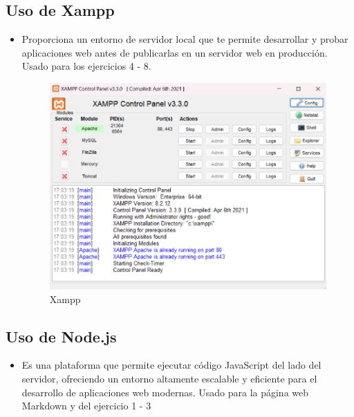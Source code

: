 \documentclass{article}
\begin{document}
	\subsection{Uso de Xampp}
	\begin{itemize}
		\item Proporciona un entorno de servidor local que te permite desarrollar y probar aplicaciones web antes de publicarlas en un servidor web en producción. Usado para los ejercicios 4 - 8.
		\begin{figure}[H]
			\centering
			\includegraphics[width=1\textwidth,keepaspectratio]{img/xampp.png}
			\caption{Xampp}
		\end{figure}
	\end{itemize}
	\subsection{Uso de Node.js}
	\begin{itemize}
		\item Es una plataforma que permite ejecutar código JavaScript del lado del servidor, ofreciendo un entorno altamente escalable y eficiente para el desarrollo de aplicaciones web modernas. Usado para la página web Markdown y del ejercicio 1 - 3
	\end{itemize}
\end{document}
